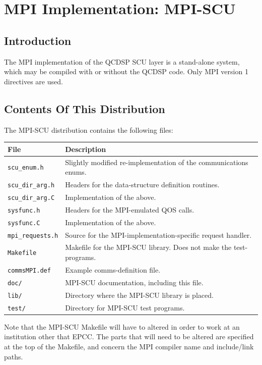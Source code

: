 \documentclass[12pt]{article}
\newcommand{\cde}[1]{{\tt #1}}            %
\begin{document}
\newpage
\section{MPI Implementation: MPI-SCU}
\subsection{Introduction}
The MPI implementation of the QCDSP SCU layer is a stand-alone system,
which may be compiled with or without the QCDSP code.  Only MPI
version 1 directives are used.

\subsection{Contents Of This Distribution}
The MPI-SCU distribution contains the following files:

\begin{tabular}{l|l}
{\bf File} & {\bf Description} \\
\hline
%
\cde{scu\_enum.h} & Slightly modified re-implementation of the
communications enums. \\
\cde{scu\_dir\_arg.h} & Headers for the data-structure definition routines. \\
\cde{scu\_dir\_arg.C} & Implementation of the above. \\
\cde{sysfunc.h} & Headers for the MPI-emulated QOS calls. \\
\cde{sysfunc.C} & Implementation of the above. \\
\cde{mpi\_requests.h} & Source for the MPI-implementation-specific request handler. \\
\cde{Makefile} & Makefile for the MPI-SCU library. Does not make the test-programs. \\
\cde{commsMPI.def} & Example comms-definition file. \\
\cde{doc/} & MPI-SCU documentation, including this file. \\
\cde{lib/} & Directory where the MPI-SCU library is placed. \\
\cde{test/} & Directory for MPI-SCU test programs. \\
%
\end{tabular}

Note that the MPI-SCU Makefile will have to altered in order to work at an
institution other that EPCC.  The parts that will need to be altered
are specified at the top of the Makefile, and concern the MPI compiler
name and include/link paths.
\end{document}
